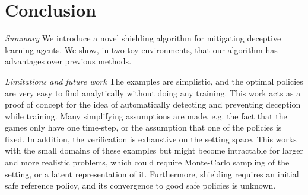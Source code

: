 \documentclass[submission,publicdomain,creativecommons noncommercial]{eptcs}
\begin{document}


\section{Conclusion}
\label{sec:Conclusion}
\emph{Summary} We introduce a novel shielding algorithm for mitigating deceptive learning agents. We show, in two toy environments, that our algorithm has advantages over previous methods. %

\emph{Limitations and future work} The examples are simplistic, and the optimal policies are very easy to find analytically without doing any training. %
This work acts as a proof of concept for the idea of automatically detecting and preventing deception while training. Many simplifying assumptions are made, e.g. the fact that the games only have one time-step, or the assumption that one of the policies is fixed. In addition, the verification is exhaustive on the setting space. This works with the small domains of these examples but might become intractable for larger and more realistic problems, which could require Monte-Carlo sampling of the setting, or a latent representation of it. Furthermore, shielding requires an initial safe reference policy, and its convergence to good safe policies is unknown. 


\nocite{*}


\end{document}
